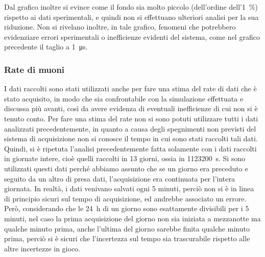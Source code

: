 Dal grafico inoltre si evince come il fondo sia molto piccolo (dell'ordine dell'\SI{1}{\percent}) rispetto ai dati sperimentali, e quindi non si effettuano ulteriori analisi per la sua riduzione. 
Non si rivelano inoltre, in tale grafico, fenomeni che potrebbero evidenziare errori sperimentali o inefficienze evidenti del sistema, come nel grafico precedente il taglio a \SI{1}{\us}.

\subsubsection{Rate di muoni}
I dati raccolti sono stati utilizzati anche per fare una stima del rate di dati che è stato acquisito, in modo che sia confrontabile con la simulazione effettuata e discussa più avanti, così da avere evidenza di eventuali inefficienze di cui non si è tenuto conto. Per fare una stima del rate non si sono potuti utilizzare tutti i dati analizzati precedentemente, in quanto a causa degli spegnimenti non previsti del sistema di acquisizione non si conosce il tempo in cui sono stati raccolti tali dati.\\

Quindi, si è ripetuta l'analisi precedentemente fatta solamente con i dati raccolti in giornate intere, cioè quelli raccolti in 13 giorni, ossia in \SI{1123200}{\s}. Si sono utilizzati questi dati perch\'e abbiamo assunto che se un giorno era preceduto e seguito da un altro di presa dati, l'acquisizione era continuata per l'intera giornata. 
In realtà, i dati venivano salvati ogni 5 minuti, perciò non si è in linea di principio sicuri sul tempo di acquisizione, ed andrebbe associato un errore. 
Però, considerando che le \SI{24}{\hour} di un giorno sono esattamente divisibili per i 5 minuti, nel caso la prima acquisizione del giorno non sia iniziata a mezzanotte ma qualche minuto prima, anche l'ultima del giorno sarebbe finita qualche minuto prima, perciò si è sicuri che l'incertezza sul tempo sia trascurabile rispetto alle altre incertezze in gioco.\\

